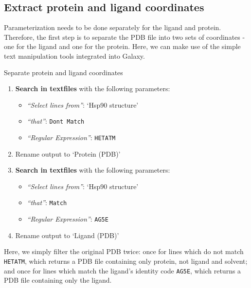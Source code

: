 \documentclass[twocolumn]{bmcart}%
\providecommand{\tightlist}{%
  \setlength{\itemsep}{0pt}\setlength{\parskip}{0pt}}
\begin{document}

\subsection*{Extract protein and ligand
coordinates}\label{extract-protein-and-ligand-coordinates}

Parameterization needs to be done separately for the ligand and protein.
Therefore, the first step is to separate the PDB file into two sets of
coordinates - one for the ligand and one for the protein. Here, we can make use of the simple text manipulation tools integrated into Galaxy.

\begin{handson_box_colour}{Separate protein and ligand coordinates}

\begin{enumerate}
\def\labelenumi{\arabic{enumi}.}
\tightlist
\item
  \textbf{Search in textfiles} with the following parameters:
  \begin{itemize}
  \tightlist
  \item
    \emph{``Select lines from''}: `Hsp90 structure'
  \item
    \emph{``that''}: \texttt{Don\textquotesingle{}t\ Match}
  \item
    \emph{``Regular Expression''}: \texttt{HETATM}
  \end{itemize}
\item
  Rename output to `Protein (PDB)'
\item
  \textbf{Search in textfiles} with the following parameters:

  \begin{itemize}
  \tightlist
  \item
    \emph{``Select lines from''}: `Hsp90 structure'
  \item
    \emph{``that''}: \texttt{Match}
  \item
    \emph{``Regular Expression''}: \texttt{AG5E}
  \end{itemize}
\item
  Rename output to `Ligand (PDB)'
\end{enumerate}

\end{handson_box_colour}

Here, we simply filter the original PDB twice: once for lines which do not match \texttt{HETATM}, which returns a PDB file containing only protein, not ligand and solvent; and once for lines which match the ligand's identity code \texttt{AG5E}, which returns a PDB file containing only the ligand.
\end{document}
